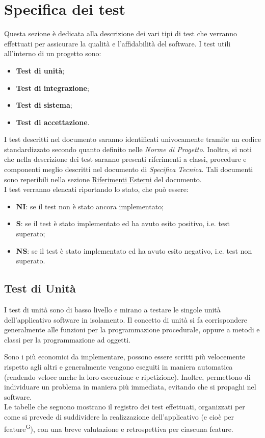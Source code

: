 \newpage
\section{Specifica dei test}\label{sec:test}
\par Questa sezione è dedicata alla descrizione dei vari tipi di test che verranno effettuati per assicurare la qualità e l'affidabilità del software.
I test utili all’interno di un progetto sono:
\begin{itemize}
    \item \textbf{Test di unità};
    \item \textbf{Test di integrazione};
    \item \textbf{Test di sistema};
    \item \textbf{Test di accettazione}.
\end{itemize}
I test descritti nel documento saranno identificati univocamente tramite un codice standardizzato secondo quanto definito nelle \textit{Norme di Progetto}. Inoltre, si noti che nella descrizione dei test saranno presenti riferimenti a classi, procedure e componenti meglio descritti nel documento di \textit{Specifica Tecnica}.
Tali documenti sono reperibili nella sezione \hyperref[sec:riferimenti_esterni]{Riferimenti Esterni} del documento.
\\ 
I test verranno elencati riportando lo stato, che può essere:
\begin{itemize}
    \item \textbf{NI}: se il test non è stato ancora implementato;
    \item \textbf{S}: se il test è stato implementato ed ha avuto esito positivo, i.e. test superato;
    \item \textbf{NS}: se il test è stato implementato ed ha avuto esito negativo, i.e. test non superato.    
\end{itemize}

\subsection{Test di Unità}
\par I test di unità sono di basso livello e mirano a testare le singole unità dell'applicativo software in isolamento. Il concetto di unità si fa corrispondere generalmente alle funzioni per la programmazione procedurale, oppure a metodi e classi per la programmazione ad oggetti.
\par Sono i più economici da implementare, possono essere scritti più velocemente rispetto agli altri e generalmente vengono eseguiti in maniera automatica (rendendo veloce anche la loro esecuzione e ripetizione). Inoltre, permettono di individuare un problema in maniera più immediata, evitando che si propaghi nel software.
\vspace{0.5cm} \\ Le tabelle che seguono mostrano il registro dei test effettuati, organizzati per come si prevede di suddividere la realizzazione dell'applicativo (e cioè per feature\textsuperscript{G}), con una breve valutazione e retrospettiva per ciascuna feature.

